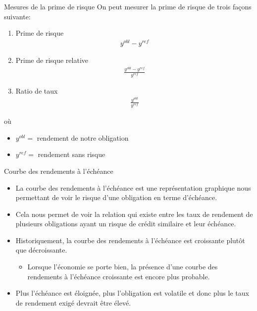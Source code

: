 \documentclass[11pt]{beamer}
\begin{document}
\begin{frame}{Mesures de la prime de risque}
On peut mesurer la prime de risque de trois façons suivante:
\begin{enumerate}
\item Prime de risque 
\begin{align*}
y^{obl}-y^{ref}
\end{align*}
\item Prime de risque relative
\begin{align*}
\frac{y^{obl}-y^{ref}}{y^{ref}}
\end{align*}
\item Ratio de taux
\begin{align*}
\frac{y^{obl}}{y^{ref}}
\end{align*}
\end{enumerate}
où 
\begin{itemize}
\item $y^{obl}=$ rendement de notre obligation
\item $y^{ref}=$ rendement sans risque
\end{itemize}
\end{frame}

\begin{frame}{Courbe des rendements à l’échéance}
\begin{itemize}
\item La courbe des rendements à l'échéance est une représentation graphique nous permettant de voir le risque d'une obligation en terme d'échéance.
\item Cela nous permet de voir la relation qui existe entre les taux de rendement de plusieurs obligations ayant un risque de crédit similaire et leur échéance.  
\item Historiquement,  la courbe des rendements à l’échéance est croissante plutôt que décroissante.
\begin{itemize}
\item Lorsque l'économie se porte bien,  la présence d'une courbe des rendements à l’échéance croissante est encore plus probable. 
\end{itemize}
\item Plus l’échéance est éloignée,  plus l’obligation est volatile et donc plus le taux de rendement exigé devrait être élevé.  
\end{itemize}
\end{frame}
\end{document}
